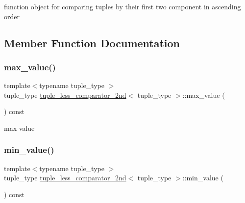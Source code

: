 function object for comparing tuples by their first two component in ascending order 

\subsection{Member Function Documentation}
\mbox{\label{structtuple__less__comparator__2nd_aaf46814db637befeda6a9225723a59f6}} 
\subsubsection{\texorpdfstring{max\+\_\+value()}{max\_value()}}
{\footnotesize\ttfamily template$<$typename tuple\+\_\+type $>$ \\
tuple\+\_\+type \hyperlink{structtuple__less__comparator__2nd}{tuple\+\_\+less\+\_\+comparator\+\_\+2nd}$<$ tuple\+\_\+type $>$\+::max\+\_\+value (\begin{DoxyParamCaption}{ }\end{DoxyParamCaption}) const\hspace{0.3cm}{\ttfamily [inline]}}



max value 

\mbox{\label{structtuple__less__comparator__2nd_a9b508a5f80bfb71efd337db16683ec7a}} 
\subsubsection{\texorpdfstring{min\+\_\+value()}{min\_value()}}
{\footnotesize\ttfamily template$<$typename tuple\+\_\+type $>$ \\
tuple\+\_\+type \hyperlink{structtuple__less__comparator__2nd}{tuple\+\_\+less\+\_\+comparator\+\_\+2nd}$<$ tuple\+\_\+type $>$\+::min\+\_\+value (\begin{DoxyParamCaption}{ }\end{DoxyParamCaption}) const\hspace{0.3cm}{\ttfamily [inline]}}



